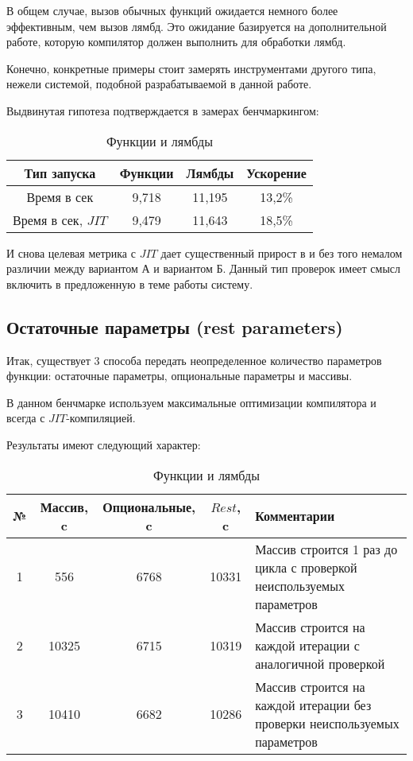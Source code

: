 \documentclass{mipt-thesis-bs}
\begin{document}
В общем случае, вызов обычных функций ожидается немного
более эффективным, чем вызов лямбд. Это ожидание базируется на
дополнительной работе, которую компилятор должен выполнить для обработки лямбд.

Конечно, конкретные примеры стоит замерять инструментами другого типа, нежели
системой, подобной разрабатываемой в данной работе.

Выдвинутая гипотеза подтверждается в замерах бенчмаркингом:

\begin{table}[h]
    \centering
    \begin{tabular}{|c|c|c|c|}
      \hline
      Тип запуска & Функции & Лямбды & Ускорение \\
      \hline
      Время в сек & 9,718 & 11,195 & 13,2\% \\
      \hline
      Время в сек, $JIT$ & 9,479 & 11,643 & 18,5\% \\
      \hline
    \end{tabular}
    \caption{Функции и лямбды}
  \end{table}

И снова целевая метрика с $JIT$ дает существенный прирост в и без того немалом
различии между вариантом А и вариантом Б. Данный тип проверок имеет смысл включить
в предложенную в теме работы систему.

\subsection{Остаточные параметры (rest parameters)}

Итак, существует 3 способа передать неопределенное количество параметров функции:
остаточные параметры, опциональные параметры и массивы.

В данном бенчмарке используем максимальные оптимизации компилятора и всегда с
$JIT$-компиляцией.

Результаты имеют следующий характер:

\begin{table}[h]
    \centering
    \begin{tabularx}{\textwidth}{|c|c|c|c|X|}
      \hline
      № & Массив, c & Опциональные, c & $Rest$, c & Комментарии \\
      \hline
      1 & 556 & 6768 & 10331 &  Массив строится 1 раз до цикла с проверкой неиспользуемых параметров \\
      \hline
      2 & 10325 & 6715 & 10319 &  Массив строится на каждой итерации с аналогичной проверкой\\
      \hline
      3 & 10410 & 6682 & 10286 &  Массив строится на каждой итерации без проверки неиспользуемых параметров\\
      \hline
    \end{tabularx}
    \caption{Функции и лямбды}
  \end{table}
\end{document}
